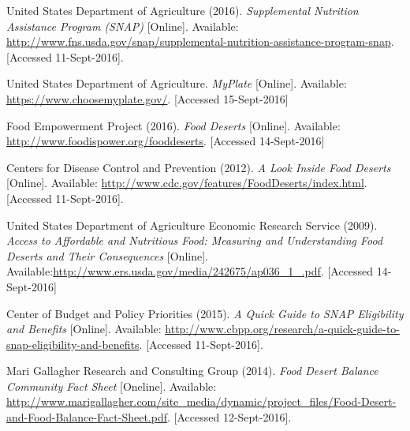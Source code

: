 \documentclass[11pt]{article}
\begin{document}
\pagebreak
\begin{thebibliography}{9}
    United States Department of Agriculture (2016).
    \textit{Supplemental Nutrition Assistance Program (SNAP)} [Online].
    Available: \url{http://www.fns.usda.gov/snap/supplemental-nutrition-assistance-program-snap}.
    [Accessed 11-Sept-2016].

    United States Department of Agriculture.
    \textit{MyPlate} [Online].
    Available: \url{https://www.choosemyplate.gov/}.
    [Accessed 15-Sept-2016]

    Food Empowerment Project (2016).
    \textit{Food Deserts} [Online].
    Available: \url{http://www.foodispower.org/fooddeserts}.
    [Accessed 14-Sept-2016]

    Centers for Disease Control and Prevention (2012).
    \textit{A Look Inside Food Deserts} [Online].
    Available: \url{http://www.cdc.gov/features/FoodDeserts/index.html}.
    [Accessed 11-Sept-2016].

    United States Department of Agriculture Economic Research Service (2009).
    \textit{Access to Affordable and Nutritious Food: Measuring and Understanding Food Deserts and
    Their Consequences} [Online].
    Available:\url{http://www.ers.usda.gov/media/242675/ap036_1_.pdf}.
    [Accessed 14-Sept-2016]

    Center of Budget and Policy Priorities (2015).
    \textit{A Quick Guide to SNAP Eligibility and Benefits} [Online].
    Available: \url{http://www.cbpp.org/research/a-quick-guide-to-snap-eligibility-and-benefits}.
    [Accessed 11-Sept-2016].

    Mari Gallagher Research and Consulting Group (2014).
    \textit{Food Desert Balance Community Fact Sheet} [Oneline].
    Available:
    \url{http://www.marigallagher.com/site_media/dynamic/project_files/Food-Desert-and-Food-Balance-Fact-Sheet.pdf}.
    [Accessed 12-Sept-2016].

\end{thebibliography}
\end{document}
